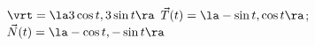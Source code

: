 {$\vrt = \la 3\cos t, 3\sin t \ra$
}
{$\vec T(t) = \la -\sin t,\cos t\ra$; $\vec N(t) = \la -\cos t,-\sin t\ra$
}